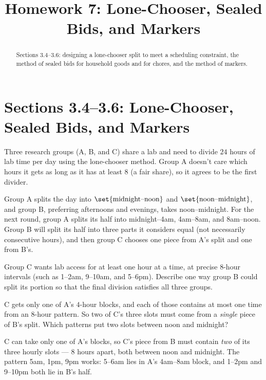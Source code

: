 \documentclass[12pt]{ximera}
\title{Homework 7: Lone-Chooser, Sealed Bids, and Markers}
\begin{document}
\begin{abstract}
Sections 3.4--3.6: designing a lone-chooser split to meet a scheduling constraint, the
method of sealed bids for household goods and for chores, and the method of markers.
\end{abstract}
\maketitle

\section*{Sections 3.4--3.6: Lone-Chooser, Sealed Bids, and Markers}

\begin{problem}
Three research groups (A, B, and C) share a lab and need to divide $24$ hours of lab time
per day using the lone-chooser method. Group A doesn't care which hours it gets as long
as it has at least $8$ (a fair share), so it agrees to be the first divider.

Group A splits the day into $\set{\text{midnight--noon}}$ and
$\set{\text{noon--midnight}}$, and group B, preferring afternoons and evenings, takes
noon--midnight. For the next round, group A splits its half into midnight--4am, 4am--8am,
and 8am--noon. Group B will split its half into three parts it considers equal (not
necessarily consecutive hours), and then group C chooses one piece from A's split and one
from B's.

\begin{prompt}
Group C wants lab access for at least one hour at a time, at precise $8$-hour intervals
(such as 1--2am, 9--10am, and 5--6pm). Describe one way group B could split its portion
so that the final division satisfies all three groups.

\begin{freeResponse}
\end{freeResponse}

\begin{hint}
C gets only one of A's $4$-hour blocks, and each of those contains at most one time from
an $8$-hour pattern. So two of C's three slots must come from a \emph{single} piece of
B's split. Which patterns put two slots between noon and midnight?
\end{hint}

\begin{feedback}
C can take only one of A's blocks, so C's piece from B must contain \emph{two} of its
three hourly slots --- $8$ hours apart, both between noon and midnight. The pattern
5am, 1pm, 9pm works: 5--6am lies in A's 4am--8am block, and 1--2pm and 9--10pm both lie in
B's half.


\end{feedback}
\end{prompt}
\end{problem}
\end{document}
